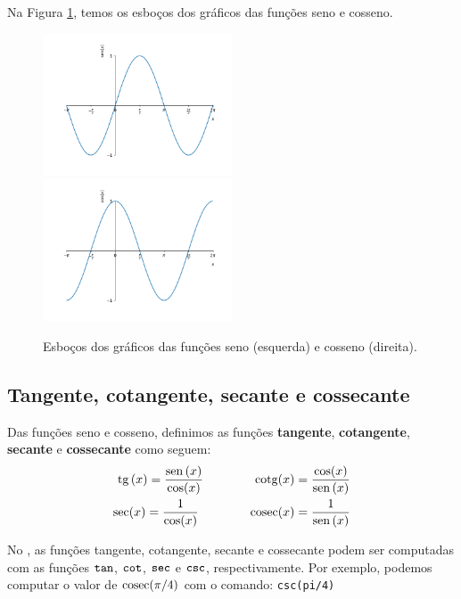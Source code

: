 \documentclass[../main.tex]{subfiles}
\begin{document}
Na Figura \ref{fig:cos_seno_graficos}, temos os esboços dos gráficos das funções seno e cosseno.

\begin{figure}[H]
  \centering
  \includegraphics[width=0.5\textwidth]{fig_func/fig_seno_grafico}~
  \includegraphics[width=0.5\textwidth]{fig_func/fig_cosseno_grafico}
  \caption{Esboços dos gráficos das funções seno (esquerda) e cosseno (direita).}
  \label{fig:cos_seno_graficos}
\end{figure}
\subsection{Tangente, cotangente, secante e cossecante}\label{subsec:Tang-Cot-Sec-Cossecante}
Das funções seno e cosseno, definimos as funções {\bf tangente}, {\bf cotangente}, {\bf secante} e {\bf cossecante} como seguem:
\begin{align*}
  \operatorname{tg}\,(x) = \frac{\operatorname{sen}\,(x)}{\cos(x)}\qquad\qquad \operatorname{cotg}(x) = \frac{\cos(x)}{\operatorname{sen}\,(x)}\\
  \sec(x) = \frac{1}{\cos(x)}\qquad\qquad \operatorname{cosec}(x) = \frac{1}{\operatorname{sen}\,(x)}
\end{align*}

\dica No \geogebra, as funções tangente, cotangente, secante e cossecante podem ser computadas com as funções $\verb+tan+$, $\verb+cot+$, $\verb+sec+$ e $\verb+csc+$, respectivamente. Por exemplo, podemos computar o valor de $\operatorname{cosec}(\pi/4)$ com o comando: \verb+csc(pi/4)+
\end{document}
